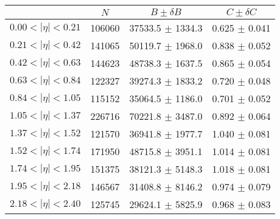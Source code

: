 \begin{tabular}{lccc}
\hline
    &   $N$   & $B \pm \delta B$  &  $C \pm \delta C$ \\
\hline
$0.00 < |\eta| <0.21$          & 106060     & 37533.5    $\pm$ 1334.3 & 0.625      $\pm$ 0.041 \\
$0.21 < |\eta| <0.42$          & 141065     & 50119.7    $\pm$ 1968.0 & 0.838      $\pm$ 0.052 \\
$0.42 < |\eta| <0.63$          & 144623     & 48738.3    $\pm$ 1637.5 & 0.865      $\pm$ 0.054 \\
$0.63 < |\eta| <0.84$          & 122327     & 39274.3    $\pm$ 1833.2 & 0.720      $\pm$ 0.048 \\
$0.84 < |\eta| <1.05$          & 115152     & 35064.5    $\pm$ 1186.0 & 0.701      $\pm$ 0.052 \\
$1.05 < |\eta| <1.37$          & 226716     & 70221.8    $\pm$ 3487.0 & 0.892      $\pm$ 0.064 \\
$1.37 < |\eta| <1.52$          & 121570     & 36941.8    $\pm$ 1977.7 & 1.040      $\pm$ 0.081 \\
$1.52 < |\eta| <1.74$          & 171950     & 48715.8    $\pm$ 3951.1 & 1.014      $\pm$ 0.081 \\
$1.74 < |\eta| <1.95$          & 151375     & 38121.3    $\pm$ 5148.3 & 1.018      $\pm$ 0.081 \\
$1.95 < |\eta| <2.18$          & 146567     & 31408.8    $\pm$ 8146.2 & 0.974      $\pm$ 0.079 \\
$2.18 < |\eta| <2.40$          & 125745     & 29624.1    $\pm$ 5825.9 & 0.968      $\pm$ 0.083 \\
\hline
\end{tabular}
